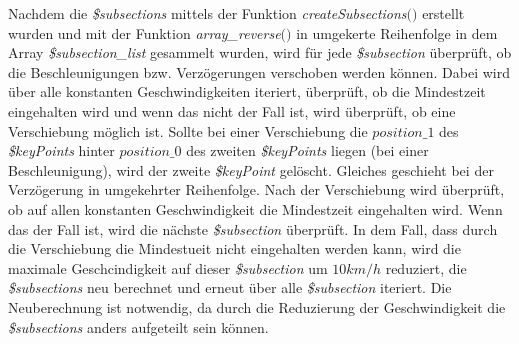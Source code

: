 Nachdem die \textit{\$subsections} mittels der Funktion \textit{createSubsections$($$)$} erstellt wurden und mit der Funktion \textit{array\_reverse$($$)$} in umgekerte Reihenfolge in dem Array \textit{\$subsection\_list} gesammelt wurden, wird für jede \textit{\$subsection} überprüft, ob die Beschleunigungen bzw. Verzögerungen verschoben werden können. Dabei wird über alle konstanten Geschwindigkeiten iteriert, überprüft, ob die Mindestzeit eingehalten wird und wenn das nicht der Fall ist, wird überprüft, ob eine Verschiebung möglich ist. Sollte bei einer Verschiebung die $position\_1$ des \textit{\$keyPoints} hinter $position\_0$ des zweiten \textit{\$keyPoints} liegen (bei einer Beschleunigung), wird der zweite \textit{\$keyPoint} gelöscht. Gleiches geschieht bei der Verzögerung in umgekehrter Reihenfolge. Nach der Verschiebung wird überprüft, ob auf allen konstanten Geschwindigkeit die Mindestzeit eingehalten wird. Wenn das der Fall ist, wird die nächste \textit{\$subsection} überprüft. In dem Fall, dass durch die Verschiebung die Mindestueit nicht eingehalten werden kann, wird die maximale Geschcindigkeit auf dieser \textit{\$subsection} um $10 km/h$ reduziert, die \textit{\$subsections} neu berechnet und erneut über alle \textit{\$subsection} iteriert. Die Neuberechnung ist notwendig, da durch die Reduzierung der Geschwindigkeit die \textit{\$subsections} anders aufgeteilt sein können.

